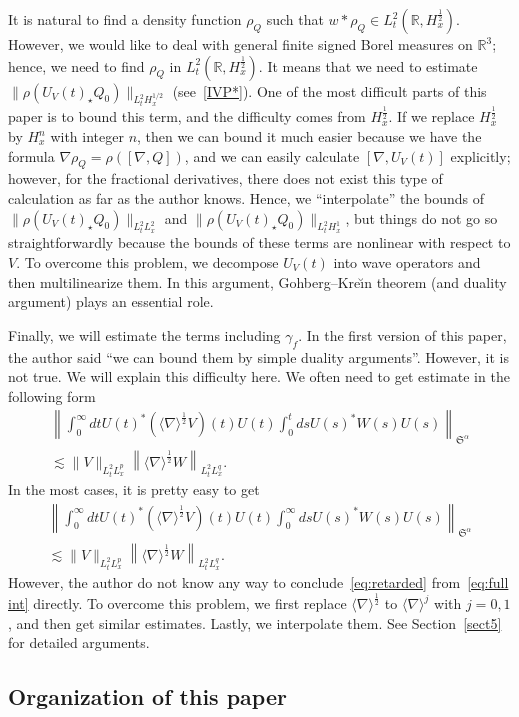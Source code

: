 \documentclass[AHL,Unicode,longabstracts,MathTools,published]{cedram}
\newcommand{\BR}{\mathbb{R}}
\newcommand{\FS}{\mathfrak{S}}
\newcommand{\al}{\alpha}
\newcommand{\ga}{\gamma}
\newcommand{\rh}{\rho}
\renewcommand{\No}[1]{\left\| #1 \right\|}
\newcommand{\I}{\infty}
\newcommand{\sd}{\langle \nabla \rangle}
\newcommand{\st}{\star}
\newcommand{\R}{\mathbb{R}}
\newcommand{\tw}{\frac{1}{2}}
\newcommand{\na}{\nabla}
\newcommand{\ls}{\lesssim}
\begin{document}
It is natural to find a density function $\rh_Q$ such that $w \ast \rh_Q \in L^2_t(\BR,H^\tw_x)$. However, we would like to deal with general finite signed Borel measures on $\R^3$; hence, we need to find $\rh_Q$ in $L^2_t(\R,H^\tw_x)$. It means that we need to estimate $\|\rh(U_V(t)_\st Q_0)\|_{L^2_t H^{1/2}_x}$ (see~\eqref{IVP*}). One of the most difficult parts of this paper is to bound this term, and the difficulty comes from $H^\tw_x$. If we replace $H^\tw_x$ by $H^n_x$ with integer $n$, then we can bound it much easier because we have the formula $\na \rh_Q = \rh([\na,Q])$, and we can easily calculate $[\na,U_V(t)]$ explicitly; however, for the fractional derivatives, there does not exist this type of calculation as far as the author knows. Hence, we ``interpolate'' the bounds of $\|\rh(U_V(t)_\st Q_0)\|_{L^2_t L^2_x}$ and $\|\rh(U_V(t)_\st Q_0)\|_{L^2_t H^1_x}$, but things do not go so straightforwardly because the bounds of these terms are nonlinear with respect to $V$. To overcome this problem, we decompose $U_V(t)$ into wave operators and then multilinearize them. In this argument, Gohberg--Kre\u{\i}n theorem (and duality argument) plays an essential role.

Finally, we will estimate the terms including $\ga_f$. In the first version of this paper, the author said ``we can bound them by simple duality arguments''. However, it is not true. We will explain this difficulty here. We often need to get estimate in the following form
\begin{multline}\label{eq:retarded}
\No{\int_0^\I dt U(t)^* \left(\sd^\tw V\right)(t)U(t) \int_0^t ds U(s)^*W(s)U(s) }_{\FS^\al} \\
\ls \|V\|_{L^2_t L^p_x} \left\|\sd^\tw W\right\|_{L^2_t L^q_x}.
\end{multline}
In the most cases, it is pretty easy to get
\begin{multline}\label{eq:full int}
\No{\int_0^\I dt U(t)^* \left(\sd^\tw V\right)(t)U(t) \int_0^\I ds U(s)^*W(s)U(s) }_{\FS^\al} \\
\ls \|V\|_{L^2_t L^p_x} \left\|\sd^\tw W\right\|_{L^2_t L^q_x}.
\end{multline}
However, the author do not know any way to conclude~\eqref{eq:retarded} from~\eqref{eq:full int} directly. To overcome this problem, we first replace $\sd^\tw$ to $\sd^j$ with $j=0,1$, and then get similar estimates. Lastly, we interpolate them. See Section~\ref{sect5} for detailed arguments.



\subsection{Organization of this paper}
\end{document}
